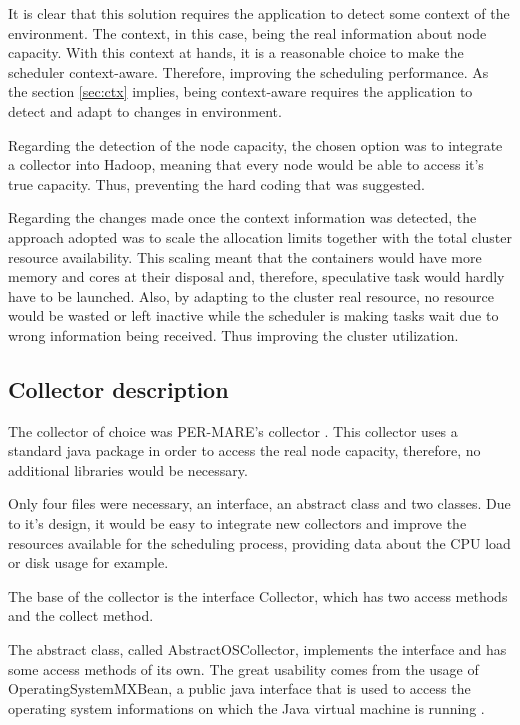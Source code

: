 It is clear that this solution requires the application to detect some context of the environment. The context, in this case, being the real information about node capacity. With this context at hands, it is a reasonable choice to make the scheduler context-aware. Therefore, improving the scheduling performance. As the section \ref{sec:ctx} implies, being context-aware requires the application to detect and adapt to changes in environment.

Regarding the detection of the node capacity, the chosen option was to integrate a collector into Hadoop, meaning that every node would be able to access it's true capacity. Thus, preventing the hard coding that was suggested.

Regarding the changes made once the context information was detected, the approach adopted was to scale the allocation limits together with the total cluster resource availability. This scaling meant that the containers would have more memory and cores at their disposal and, therefore, speculative task would hardly have to be launched. Also, by adapting to the cluster real resource, no resource would be wasted or left inactive while the scheduler is making tasks wait due to wrong information being received. Thus improving the cluster utilization.

\subsection{Collector description}
The collector of choice was PER-MARE's collector \cite{Collector}. This collector uses a standard java package in order to access the real node capacity, therefore, no additional libraries would be necessary.
 
Only four files were necessary, an interface, an abstract class and two classes. Due to it's design, it would be easy to integrate new collectors and improve the resources available for the scheduling process, providing data about the CPU load or disk usage for example.

The base of the collector is the interface Collector, which has two access methods and the collect method. 

The abstract class, called AbstractOSCollector, implements the interface and has some access methods of its own. The great usability comes from the usage of OperatingSystemMXBean, a public java interface that is used to access the operating system informations on which the Java virtual machine is running \cite{MXBean}.

